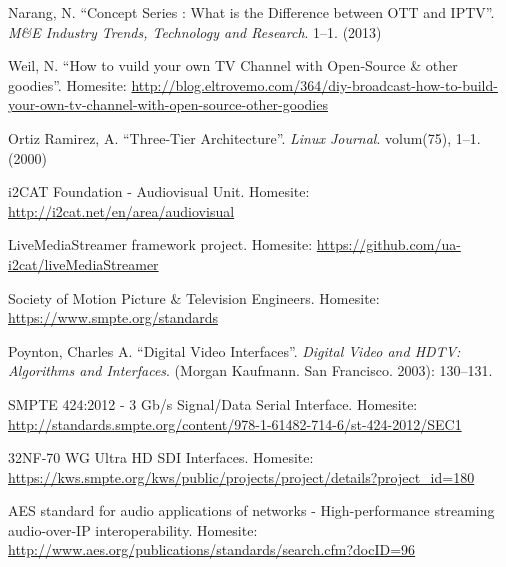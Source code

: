 \documentclass[english,final]{setup/eetac_tfc_pfc}
\begin{document}
\cleardoublepage
{}
\begin{thebibliography}{2}


Narang, N.
``Concept Series : What is the Difference between OTT and IPTV''. {\it M\&E Industry Trends, Technology and Research}.
1--1. (2013) 

Weil, N. ``How to vuild your own TV Channel with Open-Source \& other goodies''. Homesite: \url{http://blog.eltrovemo.com/364/diy-broadcast-how-to-build-your-own-tv-channel-with-open-source-other-goodies}

Ortiz Ramirez, A.
``Three-Tier Architecture''. {\it Linux Journal}.
volum(75),
1--1. (2000) 

i2CAT Foundation - Audiovisual Unit. Homesite: \url{http://i2cat.net/en/area/audiovisual}

LiveMediaStreamer framework project. Homesite: \url{https://github.com/ua-i2cat/liveMediaStreamer}

Society of Motion Picture \& Television Engineers. Homesite: \url{https://www.smpte.org/standards}

Poynton, Charles A.
``Digital Video Interfaces''. {\it Digital Video and HDTV: Algorithms and Interfaces}.
(Morgan Kaufmann. San Francisco. 2003): 130--131.

SMPTE 424:2012 - 3 Gb/s Signal/Data Serial Interface. Homesite: \url{http://standards.smpte.org/content/978-1-61482-714-6/st-424-2012/SEC1}

32NF-70 WG Ultra HD SDI Interfaces. Homesite: \url{https://kws.smpte.org/kws/public/projects/project/details?project_id=180}

AES standard for audio applications of networks - High-performance streaming audio-over-IP interoperability. Homesite: \url{http://www.aes.org/publications/standards/search.cfm?docID=96}


\end{thebibliography}
\end{document}
